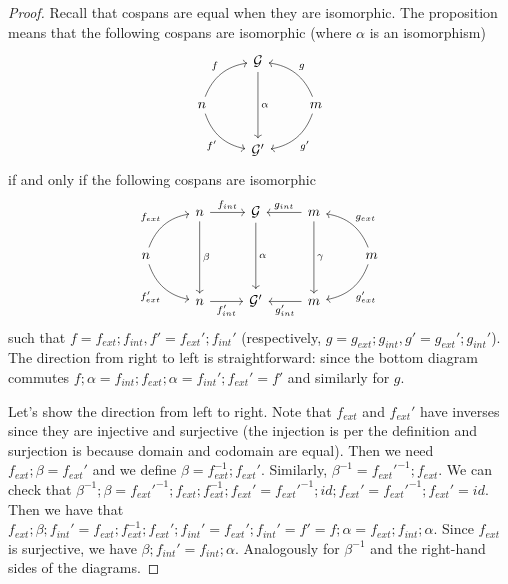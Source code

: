 \begin{proof}
    Recall that cospans are equal when they are isomorphic.
    The proposition means that the following cospans are isomorphic (where $\alpha$ is an isomorphism)
    \[\begin{tikzcd}
            & \mathcal{G} \arrow[dd, "\alpha"] &                                                            \\
    n \arrow[ru, "f", bend left] \arrow[rd, "f'"', bend right] &                                  & m \arrow[lu, "g"', bend right] \arrow[ld, "g'", bend left] \\
            & \mathcal{G}'                     &                                                           
    \end{tikzcd}
    \]
    if and only if the following cospans are isomorphic
    \[
        \begin{tikzcd}
            & n \arrow[r, "f_{int}"] \arrow[dd, "\beta"] & \mathcal{G} \arrow[dd, "\alpha"] & m \arrow[l, "g_{int}"'] \arrow[dd, "\gamma"] &                                                                        \\
n \arrow[ru, "f_{ext}", bend left] \arrow[rd, "f_{ext}'"', bend right] &                                            &                                  &                                              & m \arrow[lu, "g_{ext}"', bend right] \arrow[ld, "g_{ext}'", bend left] \\
            & n \arrow[r, "f_{int}'"']                    & \mathcal{G}'                     & m \arrow[l, "g_{int}'"]                      &                                                                       
\end{tikzcd}    
    \]
    such that $f = f_{ext};f_{int}, f'=f_{ext}';f_{int}'$ (respectively, $g = g_{ext};g_{int}, g' = g_{ext}';g_{int}'$).
    The direction from right to left is straightforward: since the bottom diagram commutes $f;\alpha = f_{int};f_{ext};\alpha = f_{int}';f_{ext}' = f'$ and similarly for $g$.
    
    Let's show the direction from left to right.
    Note that $f_{ext}$ and $f_{ext}'$ have inverses since they are injective and surjective (the injection is per the definition and surjection is because domain and codomain are equal).
    Then we need $f_{ext};\beta = f_{ext}'$ and we define $\beta = f_{ext}^{-1};f_{ext}'$.
    Similarly, $\beta^{-1} = f_{ext}'^{-1};f_{ext}$. 
    We can check that $\beta^{-1};\beta = f_{ext}'^{-1};f_{ext};f_{ext}^{-1};f_{ext}' = f_{ext}'^{-1};id;f_{ext}' = f_{ext}'^{-1};f_{ext}' = id$.
    Then we have that $f_{ext};\beta;f_{int}' = f_{ext};f_{ext}^{-1};f_{ext}';f_{int}' = f_{ext}';f_{int}' = f' = f;\alpha = f_{ext};f_{int};\alpha$.
    Since $f_{ext}$ is surjective, we have $\beta;f_{int}' = f_{int};\alpha$.
    Analogously for $\beta^{-1}$ and the right-hand sides of the diagrams.
\end{proof}

